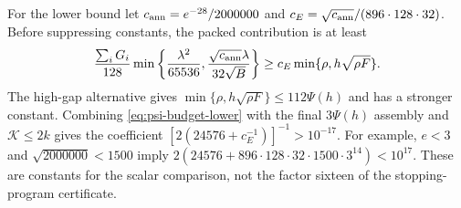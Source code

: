 For the lower bound let $c_{\rm ann}=e^{-28}/2000000$ and
$c_E=\sqrt{c_{\rm ann}}/(896\cdot128\cdot32)$.
Before suppressing constants, the packed contribution is at least
\[
 \frac{\sum_iG_i}{128}
 \min\left\{\frac{\lambda^2}{65536},
             \frac{\sqrt{c_{\rm ann}}\lambda}{32\sqrt B}\right\}
 \ge c_E\min\{\rho,h\sqrt{\rho F}\}.
\]
The high-gap alternative gives
$\min\{\rho,h\sqrt{\rho F}\}\le112\Psi(h)$ and has a stronger
constant. Combining \eqref{eq:psi-budget-lower} with the final
$3\Psi(h)$ assembly and $\mathcal K\le2k$ gives the coefficient
$[2(24576+c_E^{-1})]^{-1}>10^{-17}$.
For example, $e<3$ and $\sqrt{2000000}<1500$ imply
$2(24576+896\cdot128\cdot32\cdot1500\cdot3^{14})<10^{17}$.
These are constants for the scalar comparison, not the factor sixteen
of the stopping-program certificate.
